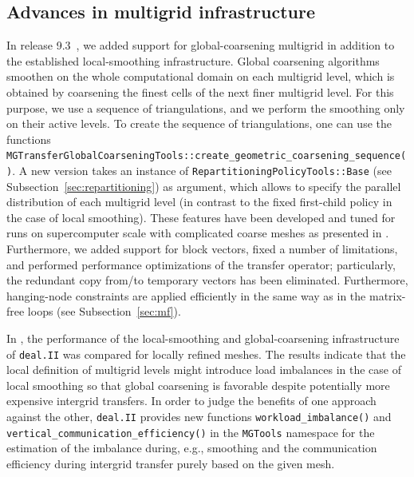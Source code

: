 \documentclass{ansarticle-preprint}
\newcommand{\specialword}[1]{\texttt{#1}}
\newcommand{\dealii}{{\specialword{deal.II}}\xspace}
\begin{document}
\subsection{Advances in multigrid infrastructure}\label{sec:multigrid}

In release 9.3~\cite{dealII93}, we added support for global-coarsening multigrid in
addition to the established local-smoothing infrastructure. Global
coarsening algorithms smoothen on the whole computational domain on each
multigrid level, which is obtained by coarsening the finest cells of
the next finer multigrid level.
For this purpose, we use a sequence of triangulations, and we perform
the smoothing only on their active levels. To create the sequence of
triangulations, one can use the functions \texttt{MGTransferGlobalCoarseningTools::create\_geometric\_coarsening\_sequence()}. A new version takes an
instance of \texttt{RepartitioningPolicyTools::Base} (see Subsection~\ref{sec:repartitioning}) as argument, which allows to specify the parallel
distribution of each multigrid level (in contrast to the fixed first-child policy in the case of local smoothing). These features have been developed and tuned for runs on supercomputer scale
with complicated coarse meshes as presented in \cite{kronbichler2021next}.
Furthermore, we added support for block vectors,
fixed a number of limitations, and performed performance optimizations of
the transfer operator; particularly, the redundant copy from/to temporary vectors
has been eliminated. Furthermore, hanging-node constraints are applied
efficiently in the same way as in the matrix-free loops (see Subsection~\ref{sec:mf}).

In \cite{munch2022gc}, the performance of the local-smoothing and global-coarsening
infrastructure of \texttt{deal.II} was compared for locally refined meshes. The results indicate that
the local definition of multigrid levels might introduce load imbalances
in the case of local smoothing so that global coarsening is favorable despite
potentially more expensive intergrid transfers. In order to judge the benefits
of one approach against the other, \texttt{deal.II} provides new functions
\texttt{workload\_imbalance()} and \texttt{vertical\_communication\_efficiency()}
in the \texttt{MGTools} namespace for the  estimation of the imbalance during, e.g.,
smoothing and the
communication efficiency during intergrid transfer purely based on the given mesh.
\end{document}
